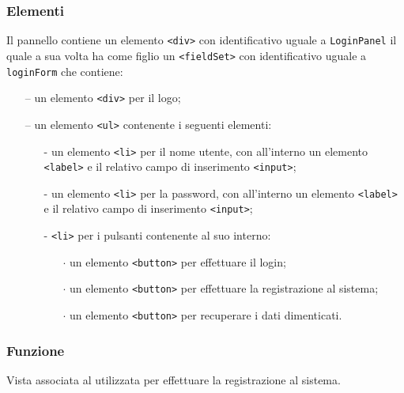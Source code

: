 \subsubsection*{Elementi}
Il pannello contiene un elemento \verb'<div>' con identificativo uguale a \verb'LoginPanel' il quale a sua volta ha come figlio un \verb'<fieldSet>' con identificativo uguale a \verb'loginForm' che contiene:
  \begin{itemize}
    \item[--] un elemento \verb'<div>' per il logo;
    \item[--] un elemento \verb'<ul>' contenente i seguenti elementi:
    \begin{itemize}
      \item[-] un elemento \verb'<li>' per il nome utente, con all'interno un elemento \verb'<label>' e il relativo campo di inserimento \verb'<input>';
      \item[-] un elemento \verb'<li>' per la password, con all'interno un elemento \verb'<label>' e il relativo campo di inserimento \verb'<input>';
      \item[-] \verb'<li>' per i pulsanti contenente al suo interno:
      \begin{itemize}
        \item[$\cdot$] un elemento \verb'<button>' per effettuare il login;
        \item[$\cdot$] un elemento \verb'<button>' per effettuare la registrazione al sistema;
        \item[$\cdot$] un elemento \verb'<button>' per recuperare i dati dimenticati.
      \end{itemize}
    \end{itemize}
  \end{itemize}

\subsubsection*{Funzione}
Vista associata al   utilizzata per effettuare la registrazione al sistema.

